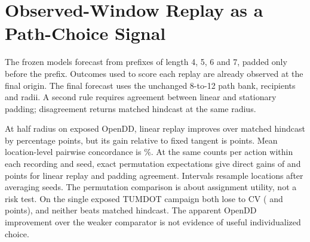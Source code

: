 \section{Observed-Window Replay as a Path-Choice Signal}
The frozen models forecast from prefixes of length 4, 5, 6 and 7,
padded only before the prefix. Outcomes used to score each replay
are already observed at the final origin. The final forecast uses
the unchanged 8-to-12 path bank, recipients and radii. A second
rule requires agreement between linear and stationary padding;
disagreement returns matched hindcast at the same radius.

At half radius on exposed OpenDD, linear replay improves over
matched hindcast by \PrefixReplayHind{} percentage points, but its gain
relative to fixed tangent is \PrefixReplayTangent{} points.
Mean location-level pairwise concordance is \PrefixReplayRank\%.
At the same counts per action within each recording and seed, exact
permutation expectations give direct gains of \PrefixReplayShuffleLinear{}
and \PrefixReplayShuffleAgree{} points for linear replay and padding
agreement. Intervals resample locations after averaging seeds. The
permutation comparison is about assignment utility, not a risk test.
On the single exposed TUMDOT campaign both lose to CV
(\PrefixReplayTumLinear{} and \PrefixReplayTumAgree{} points), and
neither beats matched hindcast. The apparent OpenDD improvement over
the weaker comparator is not evidence of useful individualized choice.
